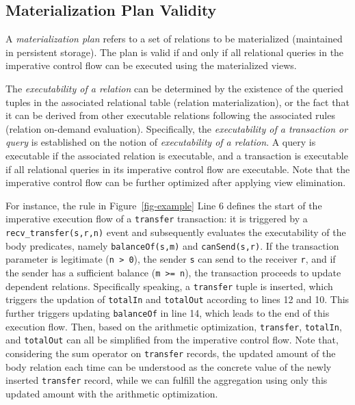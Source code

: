 \subsection{Materialization Plan Validity} 
\label{ssec:validity}

A \emph{materialization plan} refers to a set of relations to be materialized (maintained in persistent storage).
The plan is valid if and only if all relational queries in the imperative control flow can be executed using the materialized views.

The \emph{executability of a relation} can be determined by the existence of the queried tuples in the associated relational table (relation materialization), or the fact that it can be derived from other executable relations following the associated rules (relation on-demand evaluation). 
Specifically, the \emph{executability of a transaction or query} is established on the notion of \emph{executability of a relation}.
A query is executable if the associated relation is executable, 
and a transaction is executable if all relational queries in its imperative control flow are executable. Note that the imperative control flow can be further optimized after applying view elimination.

For instance, the rule in Figure~\ref{fig-example} Line 6 defines the start of the imperative execution flow of a \lstinline{transfer} transaction: it is triggered by a {\sf \lstinline{recv_transfer(s,r,n)}} event and subsequently evaluates the executability of the body predicates, namely {\sf \lstinline{balanceOf(s,m)}} and {\sf \lstinline{canSend(s,r)}}. If the transaction parameter is legitimate (\lstinline{n > 0}), the sender {\sf \lstinline{s}} can send to the receiver {\sf \lstinline{r}}, and if the sender has a sufficient balance ({\sf \lstinline{m >= n}}), the transaction proceeds to update dependent relations. Specifically speaking, a {\sf \lstinline{transfer}} tuple is inserted, which triggers the updation of {\sf \lstinline{totalIn}} and {\sf \lstinline{totalOut}} according to lines 12 and 10. This further triggers updating {\sf \lstinline{balanceOf}} in line 14, which leads to the end of this execution flow. Then, based on the arithmetic optimization, {\sf \lstinline{transfer}}, {\sf \lstinline{totalIn}}, and {\sf \lstinline{totalOut}} can all be simplified from the imperative control flow. Note that, considering the sum operator on {\sf \lstinline{transfer}} records, the updated amount of the body relation each time can be understood as the concrete value of the newly inserted {\sf \lstinline{transfer}} record, while we can fulfill the aggregation using only this updated amount with the arithmetic optimization.

